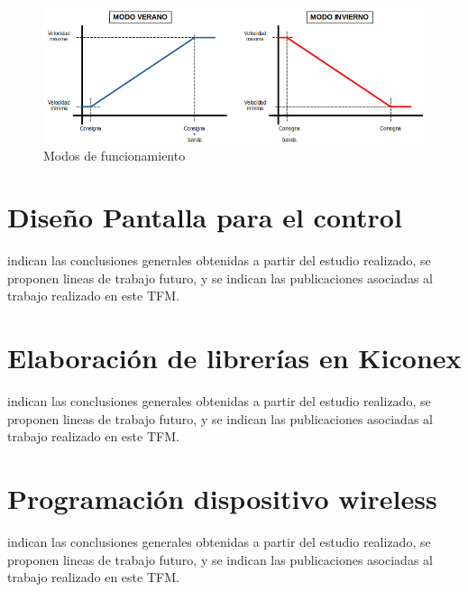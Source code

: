 \begin{figure}[H]
  \centering
  \includegraphics[width=\textwidth, keepaspectratio]{img/curvaModos}
  \caption{Modos de funcionamiento}
  \label{figura:curvasModos}
\end{figure}


\section{Diseño Pantalla para el control}
\label{sec:programacionpantalla}
indican las conclusiones generales obtenidas a partir del estudio realizado, se proponen lineas de trabajo futuro, y se indican las publicaciones asociadas al trabajo realizado en este TFM.
\section{Elaboración de librerías en Kiconex}
\label{sec:librerias}
indican las conclusiones generales obtenidas a partir del estudio realizado, se proponen lineas de trabajo futuro, y se indican las publicaciones asociadas al trabajo realizado en este TFM.
\section{Programación dispositivo wireless}
\label{sec:programacionesp32}
indican las conclusiones generales obtenidas a partir del estudio realizado, se proponen lineas de trabajo futuro, y se indican las publicaciones asociadas al trabajo realizado en este TFM.